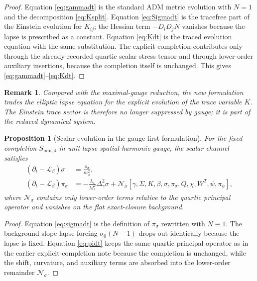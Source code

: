 \documentclass[11pt]{article}
\newcommand{\Ell}{\mathcal{L}}
\newtheorem{proposition}{Proposition}
\newtheorem{remark}{Remark}
\begin{document}
\begin{proof}
Equation \eqref{eq:gammadt} is the standard ADM metric evolution with \(N=1\) and the decomposition \eqref{eq:Ksplit}. Equation \eqref{eq:Sigmadt} is the tracefree part of the Einstein evolution for \(K_{ij}\); the Hessian term \(-D_iD_jN\) vanishes because the lapse is prescribed as a constant. Equation \eqref{eq:Kdt} is the traced evolution equation with the same substitution. The explicit completion contributes only through the already-recorded quartic scalar stress tensor and through lower-order auxiliary insertions, because the completion itself is unchanged. This gives \eqref{eq:gammadt}--\eqref{eq:Kdt}.
\end{proof}

\begin{remark}
Compared with the maximal-gauge reduction, the new formulation trades the elliptic lapse equation for the explicit evolution of the trace variable \(K\). The Einstein trace sector is therefore no longer suppressed by gauge; it is part of the reduced dynamical system.
\end{remark}

\begin{proposition}[Scalar evolution in the gauge-first formulation]
For the fixed completion \(S_{\mathrm{min},4}\) in unit-lapse spatial-harmonic gauge, the scalar channel satisfies
\begin{align}
(\partial_t-\Ell_\beta)\sigma
&=
\frac{\pi_\sigma}{m_S^2},
\label{eq:sigmadt}
\\
(\partial_t-\Ell_\beta)\pi_\sigma
&=
-\frac{\lambda_4}{M_*^2}\Delta_\gamma^2\sigma
+\mathcal N_\sigma[\gamma,\Sigma,K,\beta,\sigma,\pi_\sigma,Q,\chi,W^T,\psi,\pi_\psi],
\label{eq:pidt}
\end{align}
where \(\mathcal N_\sigma\) contains only lower-order terms relative to the quartic principal operator and vanishes on the flat exact-closure background.
\end{proposition}

\begin{proof}
Equation \eqref{eq:sigmadt} is the definition of \(\pi_\sigma\) rewritten with \(N\equiv 1\). The background-slope lapse forcing \(\sigma_0(N-1)\) drops out identically because the lapse is fixed. Equation \eqref{eq:pidt} keeps the same quartic principal operator as in the earlier explicit-completion note because the completion is unchanged, while the shift, curvature, and auxiliary terms are absorbed into the lower-order remainder \(\mathcal N_\sigma\).
\end{proof}
\end{document}
